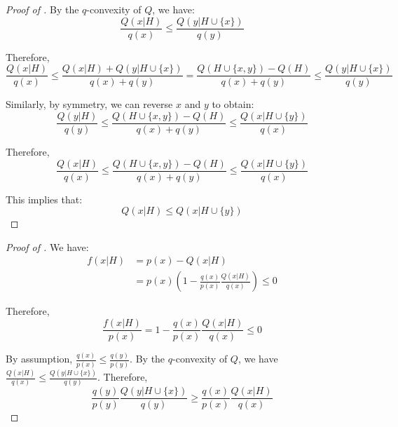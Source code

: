 \documentclass{article}
\begin{document}
\begin{proof}[Proof of ]
By the $q$-convexity of $Q$, we have:
\begin{equation}
\frac{Q(x|H)}{q(x)}\leq\frac{Q(y|H\cup\{x\})}{q(y)}
\end{equation}

Therefore,
\begin{equation}
\frac{Q(x|H)}{q(x)}\leq\frac{Q(x|H)+Q(y|H\cup\{x\})}{q(x)+q(y)}
=\frac{Q(H\cup\{x,y\})-Q(H)}{q(x)+q(y)}
\leq\frac{Q(y|H\cup\{x\})}{q(y)}
\end{equation}

Similarly, by symmetry, we can reverse $x$ and $y$ to obtain:
\begin{equation}
\frac{Q(y|H)}{q(y)}\leq\frac{Q(H\cup\{x,y\})-Q(H)}{q(x)+q(y)}\leq\frac{Q(x|H\cup\{y\})}{q(x)}
\end{equation}

Therefore,
\begin{equation}
\frac{Q(x|H)}{q(x)}\leq\frac{Q(H\cup\{x,y\})-Q(H)}{q(x)+q(y)}\leq\frac{Q(x|H\cup\{y\})}{q(x)}
\end{equation}

This implies that:
\begin{equation}
Q(x|H)\leq Q(x|H\cup\{y\})
\end{equation}
\end{proof} \begin{proof}[Proof of ]
We have:
\begin{align}
f(x|H)&=p(x)-Q(x|H)\\
&=p(x)(1-\frac{q(x)}{p(x)}\frac{Q(x|H)}{q(x)})\leq0
\end{align}

Therefore,
\begin{equation}
\frac{f(x|H)}{p(x)}=1-\frac{q(x)}{p(x)}\frac{Q(x|H)}{q(x)}\leq0
\end{equation}

By assumption, $\frac{q(x)}{p(x)}\leq\frac{q(y)}{p(y)}$. By the $q$-convexity of $Q$, we have $\frac{Q(x|H)}{q(x)}\leq\frac{Q(y|H\cup\{x\})}{q(y)}$. Therefore,
\begin{equation}
\frac{q(y)}{p(y)}\frac{Q(y|H\cup\{x\})}{q(y)}\geq\frac{q(x)}{p(x)}\frac{Q(x|H)}{q(x)}
\end{equation}


\end{proof}
\end{document}
